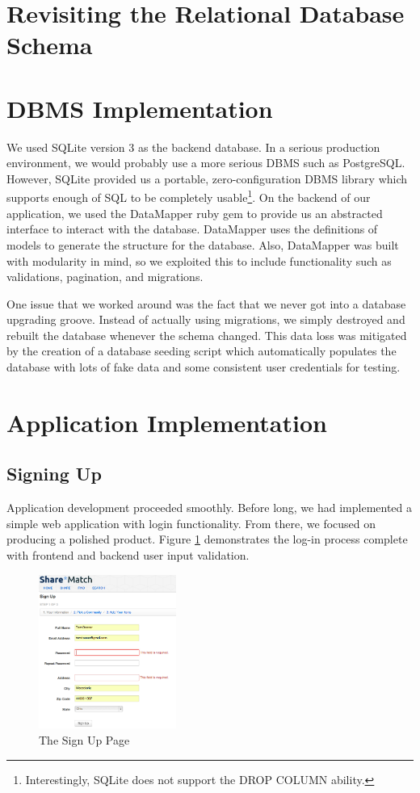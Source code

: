 \documentclass{acm_proc_article-sp}
\begin{document}
\section{Revisiting the Relational Database Schema}
\section{DBMS Implementation}
We used SQLite version 3 as the backend database. In a serious production environment, we would probably use
a more serious DBMS such as PostgreSQL. However, SQLite provided us a portable, zero-configuration DBMS library
which supports enough of SQL to be completely usable\footnote{Interestingly, SQLite does not support the DROP COLUMN ability.}.
On the backend of our application, we used the DataMapper ruby gem to provide us an abstracted interface to
interact with the database. DataMapper uses the definitions of models to generate the structure for the database.
Also, DataMapper was built with modularity in mind, so we exploited this to include functionality such as validations,
pagination, and migrations.

One issue that we worked around was the fact that we never got into a database upgrading groove. Instead of actually
using migrations, we simply destroyed and rebuilt the database whenever the schema changed. This data loss was mitigated
by the creation of a database seeding script which automatically populates the database with lots of fake data and some
consistent user credentials for testing.

\section{Application Implementation}
\subsection{Signing Up}
Application development proceeded smoothly. Before long, we had implemented a simple web application with login functionality.
From there, we focused on producing a polished product. Figure \ref{fig:SignUpPage.png} demonstrates the log-in process
complete with frontend and backend user input validation.
\begin{figure}[h]
\begin{centering}
\includegraphics[width=0.4\textwidth]{SignUpPage.png} %
\caption{The Sign Up Page}
\label{fig:SignUpPage.png}
\end{centering}
\end{figure}
\end{document}
